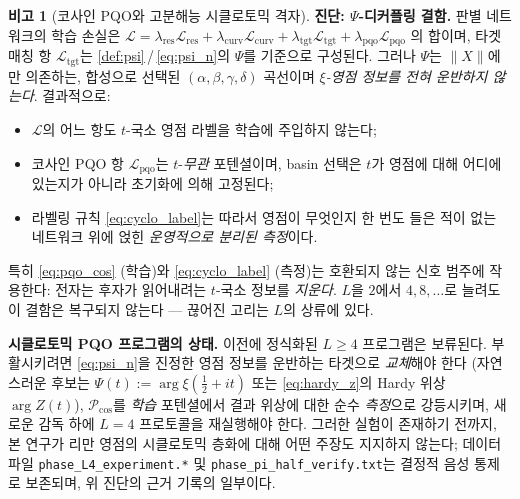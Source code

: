 \documentclass[11pt, a4paper]{article}
\theoremstyle{definition}
\newtheorem{remark}{비고}[section]
\theoremstyle{plain}
\newcommand{\xif}{\xi}
\newcommand{\Psip}{\Psi}
\begin{document}
\begin{remark}[코사인 PQO와 고분해능 시클로토믹 격자]
\smallskip\noindent\textbf{진단: $\Psip$-디커플링 결함.} 판별 네트워크의 학습 손실은
$\mathcal{L} = \lambda_{\mathrm{res}}\mathcal{L}_{\mathrm{res}} +
        \lambda_{\mathrm{curv}}\mathcal{L}_{\mathrm{curv}} +
        \lambda_{\mathrm{tgt}}\mathcal{L}_{\mathrm{tgt}} +
        \lambda_{\mathrm{pqo}}\mathcal{L}_{\mathrm{pqo}}$
의 합이며, 타겟 매칭 항 $\mathcal{L}_{\mathrm{tgt}}$는 \cref{def:psi}\,/\,\cref{eq:psi_n}의 $\Psip$를 기준으로 구성된다. 그러나 $\Psip$는 $\|X\|$에만 의존하는, 합성으로 선택된 $(\alpha,\beta,\gamma,\delta)$ 곡선이며 \emph{$\xif$-영점 정보를 전혀 운반하지 않는다}. 결과적으로:
\begin{itemize}
  \item $\mathcal{L}$의 어느 항도 $t$-국소 영점 라벨을 학습에 주입하지 않는다;
  \item 코사인 PQO 항 $\mathcal{L}_{\mathrm{pqo}}$는 $t$-\emph{무관} 포텐셜이며, basin 선택은 $t$가 영점에 대해 어디에 있는지가 아니라 초기화에 의해 고정된다;
  \item 라벨링 규칙 \cref{eq:cyclo_label}는 따라서 영점이 무엇인지 한 번도 들은 적이 없는 네트워크 위에 얹힌 \emph{운영적으로 분리된 측정}이다.
\end{itemize}
특히 \cref{eq:pqo_cos} (학습)와 \cref{eq:cyclo_label} (측정)는 호환되지 않는 신호 범주에 작용한다: 전자는 후자가 읽어내려는 $t$-국소 정보를 \emph{지운다}. $L$을 $2$에서 $4, 8, \ldots$로 늘려도 이 결함은 복구되지 않는다 — 끊어진 고리는 $L$의 상류에 있다.

\smallskip\noindent\textbf{시클로토믹 PQO 프로그램의 상태.} 이전에 정식화된 $L \geq 4$ 프로그램은 보류된다. 부활시키려면 \cref{eq:psi_n}을 진정한 영점 정보를 운반하는 타겟으로 \emph{교체}해야 한다 (자연스러운 후보는 $\Psip(t) := \arg \xif(\tfrac{1}{2}+it)$ 또는 \cref{eq:hardy_z}의 Hardy 위상 $\arg Z(t)$), $\mathcal{P}_{\cos}$를 \emph{학습} 포텐셜에서 결과 위상에 대한 순수 \emph{측정}으로 강등시키며, 새로운 감독 하에 $L=4$ 프로토콜을 재실행해야 한다. 그러한 실험이 존재하기 전까지, 본 연구가 리만 영점의 시클로토믹 층화에 대해 어떤 주장도 지지하지 않는다; 데이터 파일 \texttt{phase\_L4\_experiment.*} 및 \texttt{phase\_pi\_half\_verify.txt}는 결정적 음성 통제로 보존되며, 위 진단의 근거 기록의 일부이다.
\end{remark}
\end{document}
